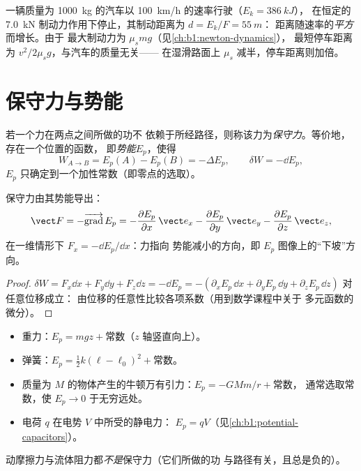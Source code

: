 \begin{example}[制动距离]\label{ex:b1:work-and-energy:braking}
一辆质量为 \qty{1000}{kg} 的汽车以 \qty{100}{km/h} 的速率行驶（$E_k = \qty{386}{kJ}$），
在恒定的 \qty{7.0}{kN} 制动力作用下停止，其制动距离为 $d = E_k/F = \qty{55}{m}$：
距离随速率的\emph{平方}而增长。由于
最大制动力为 $\mu_smg$（见\cref{ch:b1:newton-dynamics}），
最短停车距离为 $v^2/2\mu_sg$，与汽车的质量无关——
在湿滑路面上 $\mu_s$ 减半，停车距离则加倍。
\end{example}

\section{保守力与势能}

\begin{definition}[保守力；势能]\label{def:b1:work-and-energy:conservative}
若一个力在两点之间所做的功不
依赖于所经路径，则称该力为\emph{保守力}。等价地，存在一个位置的函数，
即\emph{势能}$E_p$，使得
\[
W_{A\to B} = E_p(A) - E_p(B) = -\Delta E_p ,
\qquad \delta W = -\dd E_p ,
\]
$E_p$ 只确定到一个加性常数（即零点的选取）。
\end{definition}

\begin{proposition}[由势能求力]\label{prop:b1:work-and-energy:gradient}
保守力由其势能导出：
\[
\vect F = -\overrightarrow{\operatorname{grad}}\,E_p
= -\frac{\partial E_p}{\partial x}\,\vect e_x
- \frac{\partial E_p}{\partial y}\,\vect e_y
- \frac{\partial E_p}{\partial z}\,\vect e_z ,
\]
在一维情形下 $F_x = -\dd E_p/\dd x$：力指向
势能减小的方向，即 $E_p$ 图像上的“下坡”方向。
\end{proposition}

\begin{proof}
$\delta W = F_x\dd x + F_y\dd y + F_z\dd z = -\dd E_p = -(\partial_xE_p\,\dd x
+ \partial_yE_p\,\dd y + \partial_zE_p\,\dd z)$ 对任意位移成立：
由位移的任意性比较各项系数（用到数学课程中关于
多元函数的微分）。
\end{proof}

\begin{proposition}[常见势能]\label{prop:b1:work-and-energy:eps}
\begin{itemize}
  \item 重力：$E_p = mgz + \text{常数}$（$z$ 轴竖直向上）。
  \item 弹簧：$E_p = \tfrac12 k(\ell - \ell_0)^2 + \text{常数}$。
  \item 质量为 $M$ 的物体产生的牛顿万有引力：$E_p = -GMm/r + \text{常数}$，
        通常选取常数，使 $E_p \to 0$ 于无穷远处。
  \item 电荷 $q$ 在电势 $V$ 中所受的静电力：
        $E_p = qV$（见\cref{ch:b1:potential-capacitors}）。
\end{itemize}
动摩擦力与流体阻力都\emph{不是}保守力（它们所做的功
与路径有关，且总是负的）。
\end{proposition}

